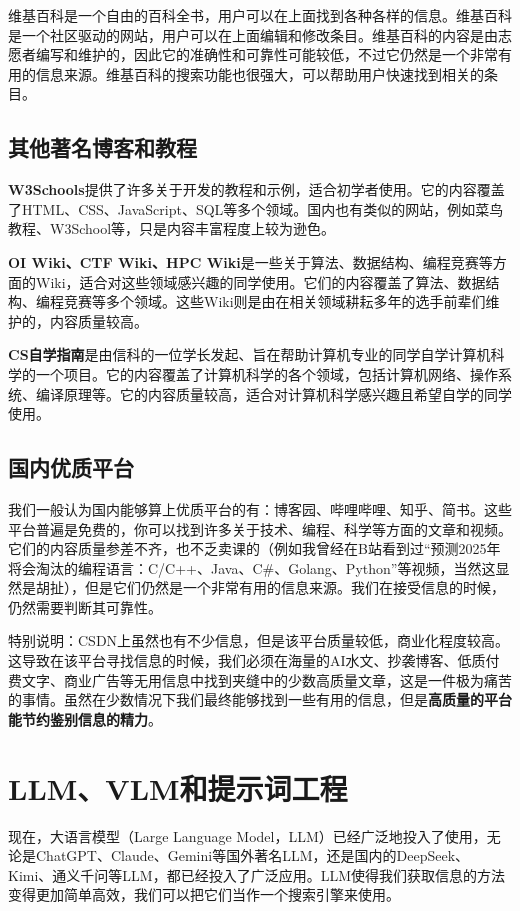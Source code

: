 \documentclass[../main.tex]{subfiles}
\begin{document}
维基百科是一个自由的百科全书，用户可以在上面找到各种各样的信息。维基百科是一个社区驱动的网站，用户可以在上面编辑和修改条目。维基百科的内容是由志愿者编写和维护的，因此它的准确性和可靠性可能较低，不过它仍然是一个非常有用的信息来源。维基百科的搜索功能也很强大，可以帮助用户快速找到相关的条目。

\subsection{其他著名博客和教程}

\textbf{W3Schools}提供了许多关于开发的教程和示例，适合初学者使用。它的内容覆盖了HTML、CSS、JavaScript、SQL等多个领域。国内也有类似的网站，例如菜鸟教程、W3School等，只是内容丰富程度上较为逊色。

\textbf{OI Wiki、CTF Wiki、HPC Wiki}是一些关于算法、数据结构、编程竞赛等方面的Wiki，适合对这些领域感兴趣的同学使用。它们的内容覆盖了算法、数据结构、编程竞赛等多个领域。这些Wiki则是由在相关领域耕耘多年的选手前辈们维护的，内容质量较高。

\textbf{CS自学指南}是由信科的一位学长发起、旨在帮助计算机专业的同学自学计算机科学的一个项目。它的内容覆盖了计算机科学的各个领域，包括计算机网络、操作系统、编译原理等。它的内容质量较高，适合对计算机科学感兴趣且希望自学的同学使用。

\subsection{国内优质平台}

我们一般认为国内能够算上优质平台的有：博客园、哔哩哔哩、知乎、简书。这些平台普遍是免费的，你可以找到许多关于技术、编程、科学等方面的文章和视频。它们的内容质量参差不齐，也不乏卖课的（例如我曾经在B站看到过“预测2025年将会淘汰的编程语言：C/C++、Java、C\#、Golang、Python”等视频，当然这显然是胡扯），但是它们仍然是一个非常有用的信息来源。我们在接受信息的时候，仍然需要判断其可靠性。

特别说明：CSDN上虽然也有不少信息，但是该平台质量较低，商业化程度较高。这导致在该平台寻找信息的时候，我们必须在海量的AI水文、抄袭博客、低质付费文字、商业广告等无用信息中找到夹缝中的少数高质量文章，这是一件极为痛苦的事情。虽然在少数情况下我们最终能够找到一些有用的信息，但是\textbf{高质量的平台能节约鉴别信息的精力}。

\section{LLM、VLM和提示词工程}

现在，大语言模型（Large Language Model，LLM）已经广泛地投入了使用，无论是ChatGPT、Claude、Gemini等国外著名LLM，还是国内的DeepSeek、Kimi、通义千问等LLM，都已经投入了广泛应用。LLM使得我们获取信息的方法变得更加简单高效，我们可以把它们当作一个搜索引擎来使用。
\end{document}

